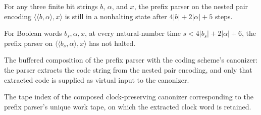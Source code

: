 \begin{lemma}
\label{Turing.timedPrefix_penultimate}
\leanok
{}
For any three finite bit strings $b$, $\alpha$, and $x$, the prefix parser on the nested
pair encoding $\langle\langle b,\alpha\rangle,x\rangle$ is still in a nonhalting state
after $4|b|+2|\alpha|+5$ steps.
\end{lemma}

\begin{lemma}
\label{Turing.timedPrefix_live}
\leanok
{}
For Boolean words $b_s,\alpha,x$, at every natural-number time $s<4|b_s|+2|\alpha|+6$,
the prefix parser on $\langle\langle b_s,\alpha\rangle,x\rangle$ has not halted.
\end{lemma}

\begin{definition}
\label{Turing.timedCanonTM}
\leanok
{}
The buffered composition of the prefix parser with the coding scheme's
canonizer: the parser extracts the code string from the nested pair encoding,
and only that extracted code is supplied as virtual input to the canonizer.
\end{definition}

\begin{definition}
\label{Turing.timedCanonClock}
\leanok
{}
The tape index of the composed clock-preserving canonizer corresponding to the
prefix parser's unique work tape, on which the extracted clock word is
retained.
\end{definition}

